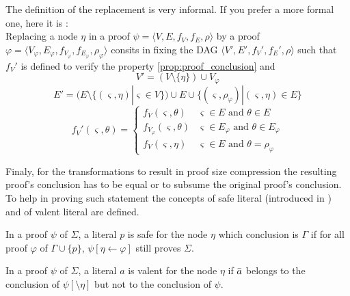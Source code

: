 \documentclass{llncs}
\begin{document}
\begin{jb}
The definition of the replacement is very informal. If you prefer a more formal one, here it is :\\
Replacing a node $\eta$ in a proof $\psi = \langle V,E,f_V,f_E,\rho \rangle$ by a proof $\varphi =
\langle V_\varphi,E_\varphi,f_{V_\varphi},f_{E_\varphi},\rho_\varphi \rangle$ consits in fixing the DAG
$\langle V',E',f_V',f_E',\rho \rangle$ such that $f_V'$ is defined to verify the property
\ref{prop:proof_conclusion} and
\begin{equation*}
  V' = (V \setminus \{\eta\}) \cup V_\varphi
\end{equation*}
\begin{equation*}
  E' = (E \setminus \{(\varsigma,\eta)|\varsigma \in V\}) \cup E \cup
       \{(\varsigma,\rho_\varphi)|(\varsigma,\eta) \in E\}
\end{equation*}
\begin{equation*}
  f_V'(\varsigma,\theta) = \begin{cases}
    f_V(\varsigma,\theta) & \varsigma \in E \text{ and } \theta \in E \\
    f_{V_\varphi}(\varsigma,\theta) & \varsigma \in E_\varphi \text{ and } \theta \in E_\varphi \\
    f_V(\varsigma,\eta) & \varsigma \in E \text{ and } \theta = \rho_\varphi
  \end{cases}
\end{equation*}
\end{jb}

Finaly, for the transformations to result in proof size compression the resulting proof's conclusion
has to be equal or to subsume the original proof's conclusion. To help in proving such statement the
concepts of safe literal (introduced in \cite{RP}) and of valent literal are defined.


\begin{definition}
In a proof $\psi$ of $\Sigma$, a literal $p$ is safe for the node $\eta$ which conclusion is $\Gamma$ if
for all proof $\varphi$ of $\Gamma \cup \{p\}$, $\psi[\eta \leftarrow \varphi]$ still proves $\Sigma$.
\end{definition}

\begin{definition}
In a proof $\psi$ of $\Sigma$, a literal $a$ is valent for the node $\eta$ if $\bar{a}$ belongs to
the conclusion of $\psi[\setminus \eta]$ but not to the conclusion of $\psi$.
\end{definition}
\end{document}
